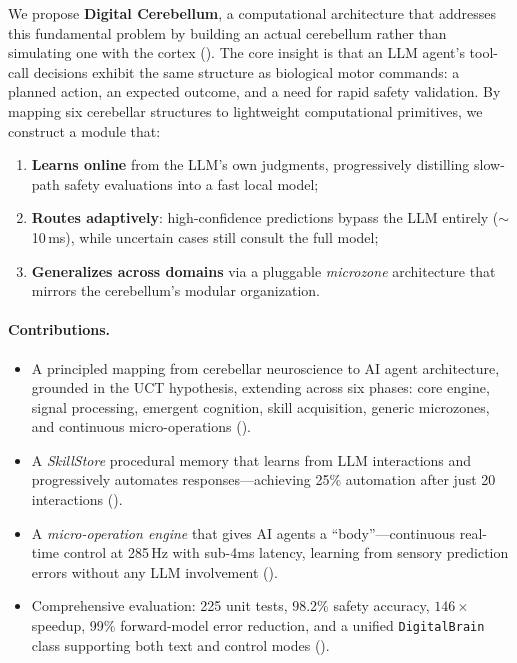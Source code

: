 \documentclass[11pt,a4paper]{article}
\begin{document}
We propose \textbf{Digital Cerebellum}, a computational architecture that addresses this fundamental problem by building an actual cerebellum rather than simulating one with the cortex ().
The core insight is that an LLM agent's tool-call decisions exhibit the same structure as biological motor commands: a planned action, an expected outcome, and a need for rapid safety validation.
By mapping six cerebellar structures to lightweight computational primitives, we construct a module that:
\begin{enumerate}[nosep]
  \item \textbf{Learns online} from the LLM's own judgments, progressively distilling slow-path safety evaluations into a fast local model;
  \item \textbf{Routes adaptively}: high-confidence predictions bypass the LLM entirely ($\sim$10\,ms), while uncertain cases still consult the full model;
  \item \textbf{Generalizes across domains} via a pluggable \emph{microzone} architecture that mirrors the cerebellum's modular organization.
\end{enumerate}

\paragraph{Contributions.}
\begin{itemize}[nosep]
  \item A principled mapping from cerebellar neuroscience to AI agent architecture, grounded in the UCT hypothesis, extending across six phases: core engine, signal processing, emergent cognition, skill acquisition, generic microzones, and continuous micro-operations ().
  \item A \emph{SkillStore} procedural memory that learns from LLM interactions and progressively automates responses---achieving 25\% automation after just 20 interactions ().
  \item A \emph{micro-operation engine} that gives AI agents a ``body''---continuous real-time control at 285\,Hz with sub-4ms latency, learning from sensory prediction errors without any LLM involvement ().
  \item Comprehensive evaluation: 225 unit tests, 98.2\% safety accuracy, $146\times$ speedup, 99\% forward-model error reduction, and a unified \texttt{DigitalBrain} class supporting both text and control modes ().
\end{itemize}
\end{document}

